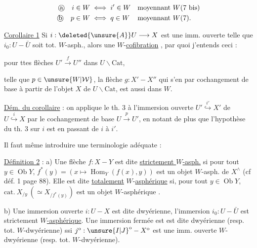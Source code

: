 \[
\begin{aligned}
\text{\textcircled{a}}\quad i\in W &\iff i'\in W &&\text{moyennant }W(7\text{ bis})\\
\text{\textcircled{b}}\quad p\in W &\iff q\in W &&\text{moyennant }W(7).
\end{aligned}
\]

\uline{Corollaire 1}  Si $i:\deleted{\unsure{A}}U\longrightarrow X$ est une imm. ouverte telle que $i_0:U\mathbin{-}\bar U$ soit tot. $W$-asph.,  alors  une $W$-\uline{cofibration} , par quoi j'entends ceci :

pour ttes flèches $U'\xrightarrow{f}U''$ dans $U\backslash\mathrm{Cat}$,

telle que $p\in\unsure{W|\mathcal W}$, la flèche $g:X'\mathbin{-}X''$ qui s'en  par cochangement de base à partir de l'objet $X$ de $U\backslash\mathrm{Cat}$, est aussi dans $W$.

\uline{Dém. du corollaire} : on applique le th. 3 à l'immersion ouverte $U'\overset{i'}{\hookrightarrow}X'$  de $U\overset{i}{\hookrightarrow}X$ par le cochangement de base $U\xrightarrow{p}U'$, en notant de plus que l'hypothèse du th. 3 sur $i$ est  en passant de $i$ à $i'$.

Il faut  même introduire une terminologie adéquate :

\uline{Définition 2} : a) Une flèche $f:X\mathbin{-}Y$ est dite \uline{strictement $W$-asph.} si pour tout $y\in\operatorname{Ob}Y$, $f^{*}(y)=(x\longmapsto\operatorname{Hom}_{Y}(f(x),y))$ est un objet  $W$-asph. de $X^{\wedge}$ (cf déf. 1 page 88). Elle est dite  \uline{totalement} $W$-\uline{asphérique} si, pour tout $y\in\operatorname{Ob}Y$, $\mathrm{cat.}\ X_{/y}\ (\simeq X_{/f^{*}(y)})$ est un objet  $W$-asphérique .

b) Une immersion ouverte $i:U\mathbin{-}X$ est dite  dwyérienne,   l'immersion  $i_0:U\mathbin{-}\bar U$ est strictement  \uline{$W$-asphérique}. Une immersion fermée est   est dite dwyérienne (resp. tot. $W$-dwyérienne) ssi $j^{\mathrm o}:\unsure{I|J}^{\mathrm o}\mathbin{-}X^{\mathrm o}$ est une imm. ouverte $W$-dwyérienne (resp. tot. $W$-dwyérienne).

